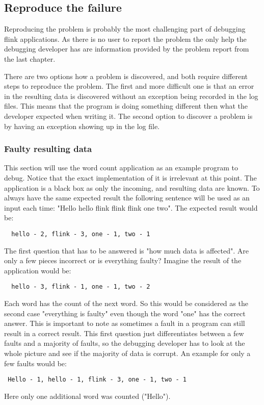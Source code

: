 \subsection{Reproduce the failure}
Reproducing the problem is probably the most challenging part of debugging flink applications. As there is no user to report the problem the only help the debugging developer has are information provided by the problem report from the last chapter.

There are two options how a problem is discovered, and both require different steps to reproduce the problem. The first and more difficult one is that an error in the resulting data is discovered without an exception being recorded in the log files. This means that the program is doing something different then what the developer expected when writing it. The second option to discover a problem is by having an exception showing up in the log file.

\subsubsection{Faulty resulting data}
This section will use the word count application as an example program to debug. Notice that the exact implementation of it is irrelevant at this point. The application is a black box as only the incoming, and resulting data are known. To always have the same expected result the following sentence will be used as an input each time: "Hello hello flink flink flink one two". The expected result would be:
\begin{lstlisting}
  hello - 2, flink - 3, one - 1, two - 1
\end{lstlisting}

The first question that has to be answered is
"how much data is affected". Are only a few pieces incorrect or is everything faulty? Imagine the result of the application would be:
\begin{lstlisting}
  hello - 3, flink - 1, one - 1, two - 2
\end{lstlisting}
  Each word has the count of the next word. So this would be considered as the second case "everything is faulty" even though the word "one" has the correct answer. This is important to note as sometimes a fault in a program can still result in a correct result. This first question just differentiates between a few faults and a majority of faults, so the debugging developer has to look at the whole picture and see if the majority of data is corrupt. An example for only a few faults would be:
\begin{lstlisting}
 Hello - 1, hello - 1, flink - 3, one - 1, two - 1
\end{lstlisting}
Here only one additional word was counted ("Hello").
